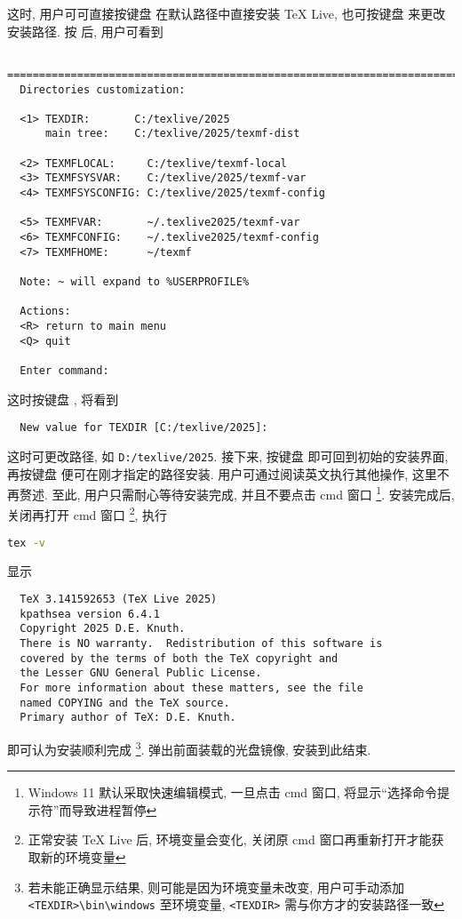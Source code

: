 这时, 用户可可直接按键盘  在默认路径中直接安装 \TeX{} Live,
也可按键盘  来更改安装路径.
按  后, 用户可看到
\begin{lstlisting}
  ==============================================================================
  Directories customization:
  
  <1> TEXDIR:       C:/texlive/2025
      main tree:    C:/texlive/2025/texmf-dist
  
  <2> TEXMFLOCAL:     C:/texlive/texmf-local
  <3> TEXMFSYSVAR:    C:/texlive/2025/texmf-var
  <4> TEXMFSYSCONFIG: C:/texlive/2025/texmf-config
  
  <5> TEXMFVAR:       ~/.texlive2025/texmf-var
  <6> TEXMFCONFIG:    ~/.texlive2025/texmf-config
  <7> TEXMFHOME:      ~/texmf
  
  Note: ~ will expand to %USERPROFILE%
  
  Actions:
  <R> return to main menu
  <Q> quit
  
  Enter command:
\end{lstlisting}
这时按键盘 , 将看到
\begin{lstlisting}
  New value for TEXDIR [C:/texlive/2025]:
\end{lstlisting}
这时可更改路径, 如 \texttt{D:/texlive/2025}.
接下来, 按键盘  即可回到初始的安装界面,
再按键盘  便可在刚才指定的路径安装.
用户可通过阅读英文执行其他操作, 这里不再赘述. 
至此, 用户只需耐心等待安装完成, 并且不要点击 \textsf{cmd} 窗口%
\footnote{Windows 11 默认采取快速编辑模式, 一旦点击 \textsf{cmd} 窗口,
将显示``选择命令提示符''而导致进程暂停}. 
安装完成后, 关闭再打开 \textsf{cmd} 窗口%
\footnote{正常安装 \TeX{} Live 后, 环境变量会变化,
关闭原 \textsf{cmd} 窗口再重新打开才能获取新的环境变量},
执行
\begin{lstlisting}[language = bash]
  tex -v
\end{lstlisting}
显示
\begin{lstlisting}
  TeX 3.141592653 (TeX Live 2025)
  kpathsea version 6.4.1
  Copyright 2025 D.E. Knuth.
  There is NO warranty.  Redistribution of this software is
  covered by the terms of both the TeX copyright and
  the Lesser GNU General Public License.
  For more information about these matters, see the file
  named COPYING and the TeX source.
  Primary author of TeX: D.E. Knuth.
\end{lstlisting}
即可认为安装顺利完成%
\footnote{若未能正确显示结果, 则可能是因为环境变量未改变,
用户可手动添加 \texttt{<TEXDIR>\textbackslash bin\textbackslash windows} 至环境变量,
\texttt{<TEXDIR>} 需与你方才的安装路径一致}.
弹出前面装载的光盘镜像,
安装到此结束.

